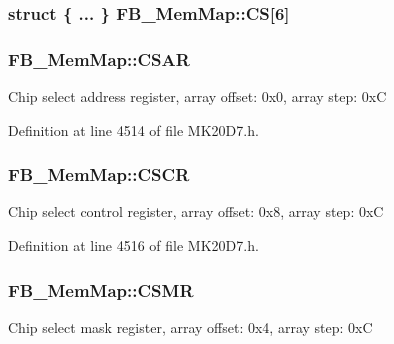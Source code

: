 \subsubsection[{\texorpdfstring{CS}{CS}}]{\setlength{\rightskip}{0pt plus 5cm}struct \{ ... \}   F\+B\+\_\+\+Mem\+Map\+::\+CS\mbox{[}6\mbox{]}}\hypertarget{struct_f_b___mem_map_a01b761d3509ca5c5edb785692645a257}{}\label{struct_f_b___mem_map_a01b761d3509ca5c5edb785692645a257}
\subsubsection[{\texorpdfstring{C\+S\+AR}{CSAR}}]{ F\+B\+\_\+\+Mem\+Map\+::\+C\+S\+AR}\hypertarget{struct_f_b___mem_map_aa59ea1aff2f195dc7d41ef8611884381}{}\label{struct_f_b___mem_map_aa59ea1aff2f195dc7d41ef8611884381}
Chip select address register, array offset\+: 0x0, array step\+: 0xC 

Definition at line 4514 of file M\+K20\+D7.\+h.

\subsubsection[{\texorpdfstring{C\+S\+CR}{CSCR}}]{ F\+B\+\_\+\+Mem\+Map\+::\+C\+S\+CR}\hypertarget{struct_f_b___mem_map_a7a1e48a5fde6382a076243009f5c0846}{}\label{struct_f_b___mem_map_a7a1e48a5fde6382a076243009f5c0846}
Chip select control register, array offset\+: 0x8, array step\+: 0xC 

Definition at line 4516 of file M\+K20\+D7.\+h.

\subsubsection[{\texorpdfstring{C\+S\+MR}{CSMR}}]{ F\+B\+\_\+\+Mem\+Map\+::\+C\+S\+MR}\hypertarget{struct_f_b___mem_map_a02c1e1542339e83d168a52e763f60228}{}\label{struct_f_b___mem_map_a02c1e1542339e83d168a52e763f60228}
Chip select mask register, array offset\+: 0x4, array step\+: 0xC 


